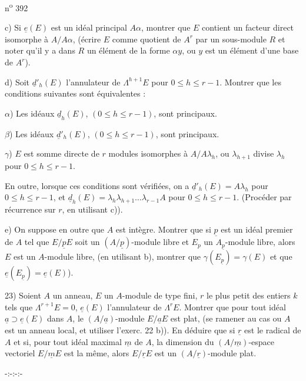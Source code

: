 \unsure{,}\hfill n\textsuperscript{o} 392

c) Si $\underline e(E)$ est un idéal principal $A\alpha$, montrer que $E$ contient un facteur direct isomorphe à $A/A\alpha$, (écrire $E$ comme quotient de $A^r$ par un sous-module $R$ et noter qu'il y a dans $R$ un élément de la forme $\alpha y$, o\rlap{\handwritten{\`{\phantom{u}}}}u $y$ est un élément d'une base de $A^r$).

d) Soit $\underline d'_h(E)$ l'annulateur de $\Lambda^{h+1}E$ pour $0\leq h\leq r-1$. Montrer que les conditions suivantes sont équivalentes :

$\alpha$) Les idéaux $\underline d_h(E)$, $(0\leq h\leq r-1)$, sont principaux.

$\beta$) Les idéaux $\underline d'_h(E)$, $(0\leq h\leq r-1)$, sont principaux.

$\gamma$) $E$ est somme directe de $r$ modules isomorphes à $A/A\lambda_h$, o\rlap{\handwritten{\`{\phantom{u}}}}u $\lambda_{h+1}$ divise $\lambda_h$ pour $0\leq h\leq r-1$.

En outre, lorsque ces conditions sont vérifiées, on a $\underline d'_h(E)=A\lambda_h$ pour $0\leq h\leq r-1$, et $\underline d_h(E)=\lambda_h\lambda_{h+1}\ldots\lambda_{r-1}A$ pour $0\leq h\leq r-1$. (Procéder par récurrence sur $r$, en utilisant c)).

e) On suppose en outre que $A$ est intègre. Montrer que si $\underline p$ est un idéal premier de $A$ tel que $E/\underline p E$ soit un $(A/\underline p)$-module libre et $E_p$ un $A_{\underline p}$-module libre, alors $E$ est un $A$-module libre, (en utilisant b), montrer que $\gamma(E_{\underline p})=\gamma(E)$ et que $\underline e(E_{\underline p})=\underline e(E)$).

23) Soient $A$ un anneau, $E$ un $A$-module de type fini, $r$ le plus petit des entiers $k$ tels que $\Lambda^{r+1}E=0$, $\underline e(E)$ l'annulateur de $\Lambda^r E$. Montrer que pour tout idéal $\underline a\supset\underline e(E)$ dans $A$, le $(A/\underline a)$-module $E/\underline a E$ est plat, (se ramener au cas o\rlap{\handwritten{\`{\phantom{u}}}}u $A$ est un anneau local, et utiliser l'exerc. 22 b)). En déduire que si $\underline r$ est le radical de $A$ et si, pour tout idéal maximal $\underline m$ de $A$, la dimension du $(A/\underline m)$-espace vectoriel $E/\underline m E$ est la même, alors $E/\underline r E$ est un $(A/\underline r)$-module plat.

\begin{center}
-:-:-:-
\end{center}

